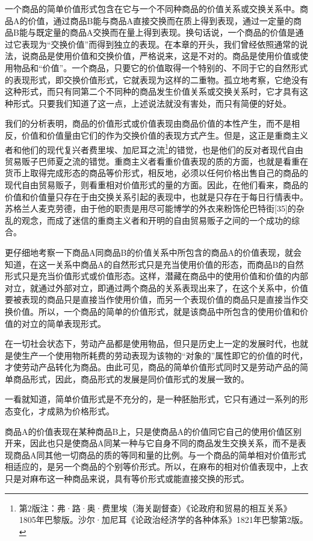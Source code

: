\documentclass{ctexbook}
\begin{document}
            一个商品的简单价值形式包含在它与一个不同种商品的价值关系或交换关系中。商品A的价值，通过商品B能与商品A直接交换而在质上得到表现，通过一定量的商品B能与既定量的商品A交换而在量上得到表现。换句话说，一个商品的价值是通过它表现为“交换价值”而得到独立的表现。在本章的开头，我们曾经依照通常的说法，说商品是使用价值和交换价值，严格说来，这是不对的。商品是使用价值或使用物品和“价值”。一个商品，只要它的价值取得一个特别的、不同于它的自然形式的表现形式，即交换价值形式，它就表现为这样的二重物。孤立地考察，它绝没有这种形式，而只有同第二个不同种的商品发生价值关系或交换关系时，它才具有这种形式。只要我们知道了这一点，上述说法就没有害处，而只有简便的好处。
            
            我们的分析表明，商品的价值形式或价值表现由商品价值的本性产生，而不是相反，价值和价值量由它们的作为交换价值的表现方式产生。但是，这正是重商主义者和他们的现代复兴者费里埃、加尼耳之流\footnote{第2版注：弗·路·奥·费里埃（海关副督查）《论政府和贸易的相互关系》1805年巴黎版。沙尔·加尼耳《论政治经济学的各种体系》1821年巴黎第2版。}的错觉，也是他们的反对者现代自由贸易贩子巴师夏之流的错觉。重商主义者看重价值表现的质的方面，也就是看重在货币上取得完成形态的商品等价形式，相反地，必须以任何价格出售自己的商品的现代自由贸易贩子，则看重相对价值形式的量的方面。因此，在他们看来，商品的价值和价值量只存在于由交换关系引起的表现中，也就是只存在于每日行情表中。苏格兰人麦克劳德，由于他的职责是用尽可能博学的外衣来粉饰伦巴特街[35]的杂乱的观念，而成了迷信的重商主义者和开明的自由贸易贩子之间的一个成功的综合。
            
            更仔细地考察一下商品A同商品B的价值关系中所包含的商品A的价值表现，就会知道，在这一关系中商品A的自然形式只是充当使用价值的形态，而商品B的自然形式只是充当价值形式或价值形态。这样，潜藏在商品中的使用价值和价值的内部对立，就通过外部对立，即通过两个商品的关系表现出来了，在这个关系中，价值要被表现的商品只是直接当作使用价值，而另一个表现价值的商品只是直接当作交换价值。所以，一个商品的简单的价值形式，就是该商品中所包含的使用价值和价值的对立的简单表现形式。
            
            在一切社会状态下，劳动产品都是使用物品，但只是历史上一定的发展时代，也就是使生产一个使用物所耗费的劳动表现为该物的“对象的”属性即它的价值的时代，才使劳动产品转化为商品。由此可见，商品的简单价值形式同时又是劳动产品的简单商品形式，因此，商品形式的发展是同价值形式的发展一致的。
            
            一看就知道，简单价值形式是不充分的，是一种胚胎形式，它只有通过一系列的形态变化，才成熟为价格形式。
            
            商品A的价值表现在某种商品B上，只是使商品A的价值同它自己的使用价值区别开来，因此也只是使商品A同某一种与它自身不同的商品发生交换关系，而不是表现商品A同其他一切商品的质的等同和量的比例。与一个商品的简单相对价值形式相适应的，是另一个商品的个别等价形式。所以，在麻布的相对价值表现中，上衣只是对麻布这一种商品来说，具有等价形式或能直接交换的形式。
            
\end{document}

